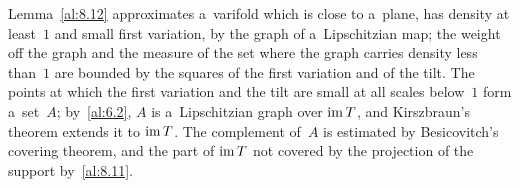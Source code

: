 \begin{miniremark}
    \label{mr:8.12}
    Lemma~\ref{al:8.12} approximates a~varifold which is close to a~plane, has density at least~$1$
    and small first variation, by the graph of a~Lipschitzian map; the weight off the graph and the
    measure of the set where the graph carries density less than~$1$ are bounded by the squares of
    the first variation and of the tilt. The points at which the first variation and the tilt are
    small at all scales below~$1$ form a~set~$A$; by~\ref{al:6.2}, $A$ is a~Lipschitzian graph over
    $\operatorname{im} T$, and Kirszbraun's theorem extends it to $\operatorname{im} T$. The complement of~$A$ is estimated
    by Besicovitch's covering theorem, and the part of $\operatorname{im} T$ not covered by the projection of the
    support by~\ref{al:8.11}.
\end{miniremark}

